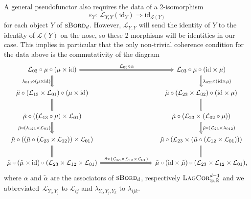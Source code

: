 \documentclass[pdftex]{sigma}
\numberwithin{equation}{section}
\newcommand{\LagCor}{\textsc{LagCor}}
\newcommand{\R}{\mathbb{R}}
\newcommand{\id}{\mathrm{id}}
\newcommand{\sBord}{\textsc{sBord}}
\begin{document}
A general pseudofunctor also requires the data of a 2-isomorphism
\begin{equation*}
\varepsilon_Y\colon\ \mathcal{L}_{Y, Y}(\id_Y) \Longrightarrow \id_{\mathcal{L}(Y)}
\end{equation*}
for each object $Y$ of $\sBord_d$.
However, $\mathcal{L}_{Y, Y}$ will send the identity of $Y$ to the identity of $\mathcal{L}(Y)$ on the nose, so these 2-morphisms will be identities in our case.
This implies in particular that the only non-trivial coherence condition for the data above is the commutativity of the diagram%
\begin{equation*}
\begin{tikzcd}[column sep=2.8cm]
\mathcal{L}_{03} \circ \mu \circ (\mu \times \id) \ar[r, "\mathcal{L}_{03} \circ \alpha", Rightarrow]
\ar[d, Rightarrow, "\lambda_{013} \circ (\mu \times \id)"']
	&
	\mathcal{L}_{03} \circ \mu \circ (\id \times \mu)
	\ar[d, Rightarrow, "\lambda_{023} \circ (\id \times \mu)"]
	\\
\tilde{\mu} \circ (\mathcal{L}_{13} \times \mathcal{L}_{01}) \circ (\mu \times \id)
	\ar[d, equal]
	&
	\tilde{\mu} \circ (\mathcal{L}_{23} \times \mathcal{L}_{02}) \circ ( \id \times \mu )
	\ar[d, equal]
\\
\tilde{\mu} \circ ((\mathcal{L}_{13} \circ \mu)\times \mathcal{L}_{01})
	\ar[d, Rightarrow, "\tilde{\mu} \circ (\lambda_{123} \times \mathcal{L}_{01})"']
	&
	\tilde{\mu} \circ (\mathcal{L}_{23} \times (\mathcal{L}_{02} \circ \mu ))
	\ar[d, Rightarrow, "\tilde{\mu} \circ (\mathcal{L}_{23} \times \lambda_{012})"]
\\
 \tilde{\mu} \circ ((\tilde{\mu} \circ (\mathcal{L}_{23} \times \mathcal{L}_{12})) \times \mathcal{L}_{01})
 		\ar[d, equal]
 		&
		\tilde{\mu} \circ (\mathcal{L}_{23} \times (\tilde{\mu} \circ ( \mathcal{L}_{12} \times \mathcal{L}_{01})))
		\ar[d, equal]
		\\
 \tilde{\mu} \circ (\tilde{\mu} \times \id) \circ (\mathcal{L}_{23} \times \mathcal{L}_{12} \times \mathcal{L}_{01})
 	\ar[r, Rightarrow, "\tilde{\alpha} \circ (\mathcal{L}_{23} \times \mathcal{L}_{12} \times \mathcal{L}_{01})"]
 		&
		\tilde{\mu} \circ (\id \times \tilde{\mu}) \circ (\mathcal{L}_{23} \times \mathcal{L}_{12} \times \mathcal{L}_{01}),
\end{tikzcd}
\end{equation*}
where $\alpha$ and $\tilde{\alpha}$ are the associators of $\sBord_d$, respectively $\LagCor_{\otimes, \R}^{d-1}$ and we abbreviated~$\mathcal{L}_{Y_i, Y_j}$ to $\mathcal{L}_{ij}$ and $\lambda_{Y_i, Y_j, Y_k}$ to $\lambda_{ijk}$.
\end{document}

